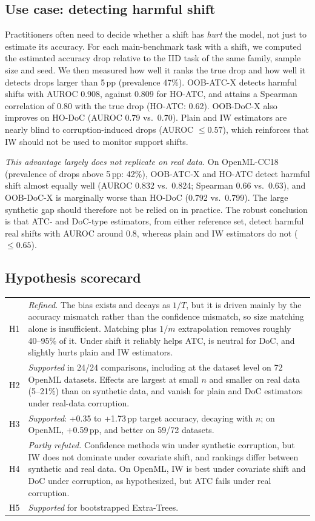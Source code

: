 \subsection{Use case: detecting harmful shift}

Practitioners often need to decide whether a shift has \emph{hurt} the model, not just to estimate its accuracy. For each main-benchmark task with a shift, we computed the estimated accuracy drop relative to the IID task of the same family, sample size and seed. We then measured how well it ranks the true drop and how well it detects drops larger than 5\,pp (prevalence 47\%). OOB-ATC-X detects harmful shifts with AUROC 0.908, against 0.809 for HO-ATC, and attains a Spearman correlation of 0.80 with the true drop (HO-ATC: 0.62). OOB-DoC-X also improves on HO-DoC (AUROC 0.79 vs.\ 0.70). Plain and IW estimators are nearly blind to corruption-induced drops (AUROC $\le0.57$), which reinforces that IW should not be used to monitor support shifts.

\emph{This advantage largely does not replicate on real data.} On OpenML-CC18 (prevalence of drops above 5\,pp: 42\%), OOB-ATC-X and HO-ATC detect harmful shift almost equally well (AUROC 0.832 vs.\ 0.824; Spearman 0.66 vs.\ 0.63), and OOB-DoC-X is marginally worse than HO-DoC (0.792 vs.\ 0.799). The large synthetic gap should therefore not be relied on in practice. The robust conclusion is that ATC- and DoC-type estimators, from either reference set, detect harmful real shifts with AUROC around 0.8, whereas plain and IW estimators do not ($\le0.65$).

\subsection{Hypothesis scorecard}
\begin{center}\small
\begin{tabular}{lp{11.5cm}}
\toprule
H1 & \emph{Refined.} The bias exists and decays as $1/T$, but it is driven mainly by the accuracy mismatch rather than the confidence mismatch, so size matching alone is insufficient. Matching plus $1/m$ extrapolation removes roughly 40--95\% of it. Under shift it reliably helps ATC, is neutral for DoC, and slightly hurts plain and IW estimators.\\
H2 & \emph{Supported} in 24/24 comparisons, including at the dataset level on 72 OpenML datasets. Effects are largest at small $n$ and smaller on real data (5--21\%) than on synthetic data, and vanish for plain and DoC estimators under real-data corruption.\\
H3 & \emph{Supported}: +0.35 to +1.73\,pp target accuracy, decaying with $n$; on OpenML, +0.59\,pp, and better on 59/72 datasets.\\
H4 & \emph{Partly refuted.} Confidence methods win under synthetic corruption, but IW does not dominate under covariate shift, and rankings differ between synthetic and real data. On OpenML, IW is best under covariate shift and DoC under corruption, as hypothesized, but ATC fails under real corruption.\\
H5 & \emph{Supported} for bootstrapped Extra-Trees.\\
\bottomrule
\end{tabular}
\end{center}
